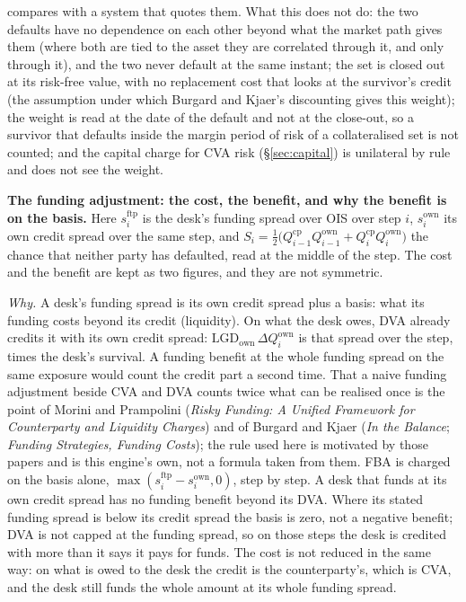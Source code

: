 \documentclass[11pt,a4paper]{article}
\begin{document}
compares with a system that quotes them. What this does not do: the two defaults have no dependence on each other beyond what the market path gives them (where both are tied to the asset they are correlated through it, and only through it), and the two never default at the same instant; the set is closed out at its risk-free value, with no replacement cost that looks at the survivor's credit (the assumption under which Burgard and Kjaer's discounting gives this weight); the weight is read at the date of the default and not at the close-out, so a survivor that defaults inside the margin period of risk of a collateralised set is not counted; and the capital charge for CVA risk (\S\ref{sec:capital}) is unilateral by rule and does not see the weight.

\textbf{The funding adjustment: the cost, the benefit, and why the benefit is on the basis.} Here $s^{\mathrm{ftp}}_i$ is the desk's funding spread over OIS over step $i$, $s^{\mathrm{own}}_i$ its own credit spread over the same step, and $S_i=\tfrac12\big(Q^{\mathrm{cp}}_{i-1}Q^{\mathrm{own}}_{i-1}+Q^{\mathrm{cp}}_iQ^{\mathrm{own}}_i\big)$ the chance that neither party has defaulted, read at the middle of the step. The cost and the benefit are kept as two figures, and they are not symmetric.

\emph{Why.} A desk's funding spread is its own credit spread plus a basis: what its funding costs beyond its credit (liquidity). On what the desk owes, DVA already credits it with its own credit spread: $\mathrm{LGD}_{\mathrm{own}}\,\Delta Q^{\mathrm{own}}_i$ is that spread over the step, times the desk's survival. A funding benefit at the whole funding spread on the same exposure would count the credit part a second time. That a naive funding adjustment beside CVA and DVA counts twice what can be realised once is the point of Morini and Prampolini (\emph{Risky Funding: A Unified Framework for Counterparty and Liquidity Charges}) and of Burgard and Kjaer (\emph{In the Balance}; \emph{Funding Strategies, Funding Costs}); the rule used here is motivated by those papers and is this engine's own, not a formula taken from them. FBA is charged on the basis alone, $\max(s^{\mathrm{ftp}}_i-s^{\mathrm{own}}_i,0)$, step by step. A desk that funds at its own credit spread has no funding benefit beyond its DVA. Where its stated funding spread is below its credit spread the basis is zero, not a negative benefit; DVA is not capped at the funding spread, so on those steps the desk is credited with more than it says it pays for funds. The cost is not reduced in the same way: on what is owed to the desk the credit is the counterparty's, which is CVA, and the desk still funds the whole amount at its whole funding spread.
\end{document}
